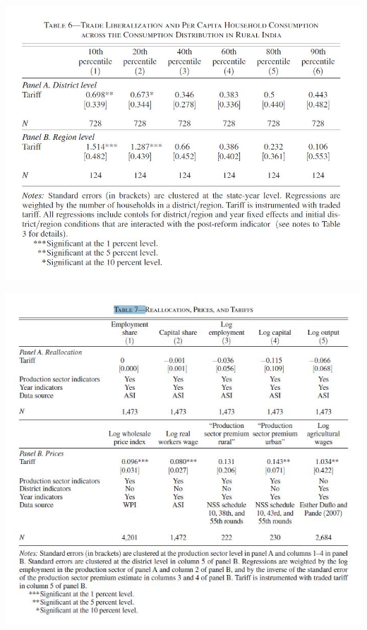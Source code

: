 \documentclass[a4paper,12pt]{article}
\begin{document}
\begin{table}[h]
\centering
\includegraphics[width=1\textwidth]{table6.JPG}
\caption{\label{fig:Figure1}}
\end{table}

\begin{table}[h]
\centering
\includegraphics[width=1\textwidth]{table7.JPG}
\caption{\label{fig:Figure1}}
\end{table}
\end{document}
